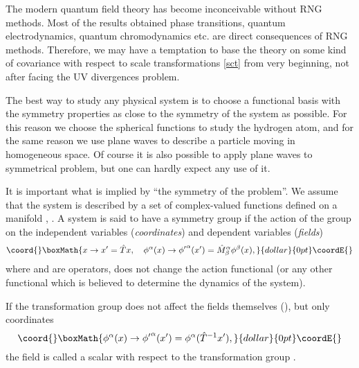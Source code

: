 \documentclass[a4paper,a4paper]{article}
\begin{document}
The modern quantum field theory has become inconceivable without 
RNG methods. Most of the results obtained phase transitions, 
quantum electrodynamics, quantum chromodynamics etc. are direct 
consequences of RNG methods. Therefore, we may have a temptation 
to base the theory on some kind of covariance with respect to 
scale transformations \eqref{sct} from very beginning, not after 
facing the UV divergences problem. 

The best way to study any physical system is to choose a functional 
basis with the symmetry properties as close to the symmetry of the 
system as possible. For this reason we choose the spherical functions 
to study the hydrogen atom, and for the same reason we use plane waves 
to describe a particle moving in homogeneous space. Of course it is 
also possible to apply plane waves to \coordHE{} symmetrical problem, but 
one can hardly expect any use of it. 

It is important what is implied by ``the symmetry of the problem''. 
We assume that the system is described by a set of complex-valued 
functions \myHighlight{$\phi^\alpha$}\coordHE{} defined on a manifold \coordHE{},  
 \coordHE{}.
A system is said to have a symmetry group \coordHE{} if the action of 
the group \coordHE{} on the independent variables ({\em coordinates}) 
and dependent variables ({\em fields})
$$\coord{}\boxMath{
x \to x' = \hat T x, \quad 
\phi^\alpha(x) \to {\phi'}^\alpha(x') = {\hat M}^\alpha_\beta \phi^\beta(x), 
}{dollar}{0pt}\coordE{}$$
where \coordHE{} and \coordHE{} are operators, does not change the action 
functional
(or any other functional which is believed to determine the dynamics of 
the system). 

If the transformation group does not affect the fields themselves 
(\coordHE{}), but only coordinates
$$\coord{}\boxMath{
\phi^\alpha(x) \to {\phi'}^\alpha(x') = \phi^\alpha({\hat T}^{-1}x'),
}{dollar}{0pt}\coordE{}$$
the field \myHighlight{$\phi^\alpha$}\coordHE{} is called a scalar with respect to the 
transformation group \coordHE{}. 
\end{document}
